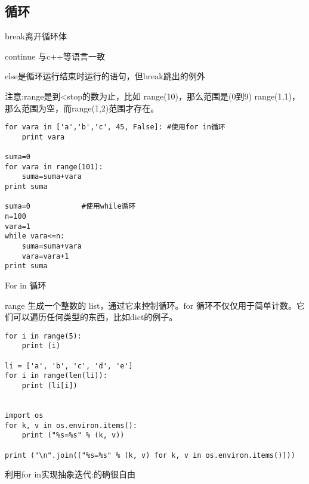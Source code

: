 \documentclass[twoside,11pt]{book}
\begin{document}
\subsection{循环}

break离开循环体

continue 与c++等语言一致

else是循环运行结束时运行的语句，但break跳出的例外

注意:range是到<stop的数为止，比如
range(10)，那么范围是(0到9)
range(1,1)，那么范围为空，而range(1,2)范围才存在。

\begin{lstlisting}
for vara in ['a','b','c', 45, False]: #使用for in循环
    print vara

suma=0
for vara in range(101):
    suma=suma+vara
print suma

suma=0            #使用while循环
n=100
vara=1
while vara<=n:
    suma=suma+vara
    vara=vara+1
print suma
\end{lstlisting}

For in 循环

range 生成一个整数的 list，通过它来控制循环。for 循环不仅仅用于简单计数。它们可以遍历任何类型的东西，比如dict的例子。
\begin{lstlisting}
for i in range(5):
    print (i)

li = ['a', 'b', 'c', 'd', 'e']
for i in range(len(li)):
    print (li[i])


import os
for k, v in os.environ.items():
    print ("%s=%s" % (k, v))

print ("\n".join(["%s=%s" % (k, v) for k, v in os.environ.items()]))
\end{lstlisting}

利用for in实现抽象迭代:的确很自由
\end{document}
